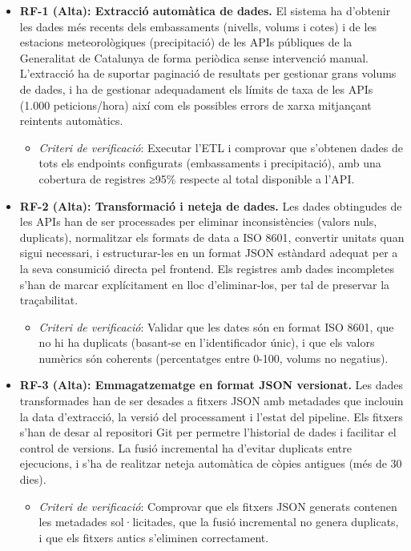 \begin{itemize}
    \item \textbf{RF-1 (Alta): Extracció automàtica de dades.} El sistema ha d'obtenir les dades més recents dels embassaments (nivells, volums i cotes) i de les estacions meteorològiques (precipitació) de les APIs públiques de la Generalitat de Catalunya de forma periòdica sense intervenció manual. L'extracció ha de suportar paginació de resultats per gestionar grans volums de dades, i ha de gestionar adequadament els límits de taxa de les APIs (1.000 peticions/hora) així com els possibles errors de xarxa mitjançant reintents automàtics.
    \begin{itemize}
        \item \textit{Criteri de verificació}: Executar l'ETL i comprovar que s'obtenen dades de tots els endpoints configurats (embassaments i precipitació), amb una cobertura de registres ≥95\% respecte al total disponible a l'API.
    \end{itemize}

    \item \textbf{RF-2 (Alta): Transformació i neteja de dades.} Les dades obtingudes de les APIs han de ser processades per eliminar inconsistències (valors nuls, duplicats), normalitzar els formats de data a ISO 8601, convertir unitats quan sigui necessari, i estructurar-les en un format JSON estàndard adequat per a la seva consumició directa pel frontend. Els registres amb dades incompletes s'han de marcar explícitament en lloc d'eliminar-los, per tal de preservar la traçabilitat.
    \begin{itemize}
        \item \textit{Criteri de verificació}: Validar que les dates són en format ISO 8601, que no hi ha duplicats (basant-se en l'identificador únic), i que els valors numèrics són coherents (percentatges entre 0-100, volums no negatius).
    \end{itemize}

    \item \textbf{RF-3 (Alta): Emmagatzematge en format JSON versionat.} Les dades transformades han de ser desades a fitxers JSON amb metadades que inclouin la data d'extracció, la versió del processament i l'estat del pipeline. Els fitxers s'han de desar al repositori Git per permetre l'historial de dades i facilitar el control de versions. La fusió incremental ha d'evitar duplicats entre ejecucions, i s'ha de realitzar neteja automàtica de còpies antigues (més de 30 dies).
    \begin{itemize}
        \item \textit{Criteri de verificació}: Comprovar que els fitxers JSON generats contenen les metadades sol·licitades, que la fusió incremental no genera duplicats, i que els fitxers antics s'eliminen correctament.
    \end{itemize}
\end{itemize}


